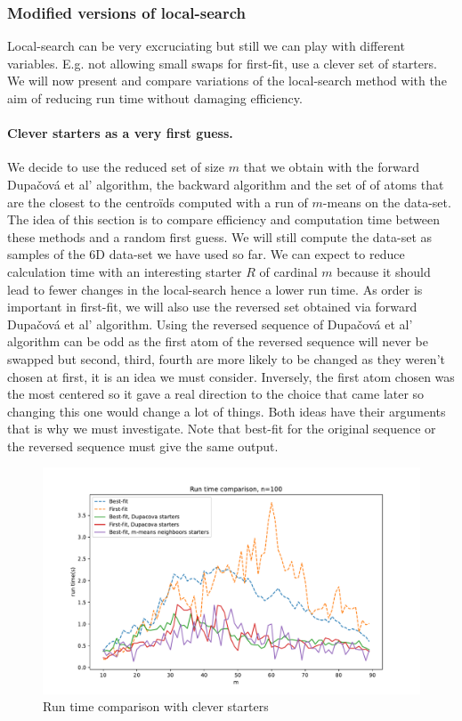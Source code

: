 \documentclass{amsart}
\begin{document}
\subsubsection{Modified versions of local-search}
Local-search can be very excruciating but still we can play with different variables. E.g. not allowing small swaps for first-fit, use a clever set of starters. We will now present and compare variations of the local-search method with the aim of reducing run time without damaging efficiency. 

\paragraph{\textbf{Clever starters as a very first guess.}}
We decide to use the reduced set of size $m$ that we obtain with the forward Dupačová et al' algorithm, the backward algorithm and the set of of atoms that are the closest to the centroïds computed with a run of $m$-means on the data-set. The idea of this section is to compare efficiency and computation time between these methods and a random first guess. We will still compute the data-set as samples of the 6D data-set we have used so far. We can expect to reduce calculation time with an interesting starter $R$ of cardinal $m$ because it should lead to fewer changes in the local-search hence a lower run time. As order is important in first-fit, we will also use the reversed set obtained via forward Dupačová et al' algorithm. Using the reversed sequence of Dupačová et al' algorithm can be odd as the first atom of the reversed sequence will never be swapped but second, third, fourth are more likely to be changed as they weren't chosen at first, it is an idea we must consider. Inversely, the first atom chosen was the most centered so it gave a real direction to the choice that came later so changing this one would change a lot of things. Both ideas have their arguments that is why we must investigate. Note that best-fit for the original sequence or the reversed sequence must give the same output.

\begin{figure}[!h]
    \centering
    \includegraphics[width=0.5\linewidth]{plots/good methods.pdf}
    \caption{Run time comparison with clever starters}
    \label{good methods}
\end{figure}
\end{document}

